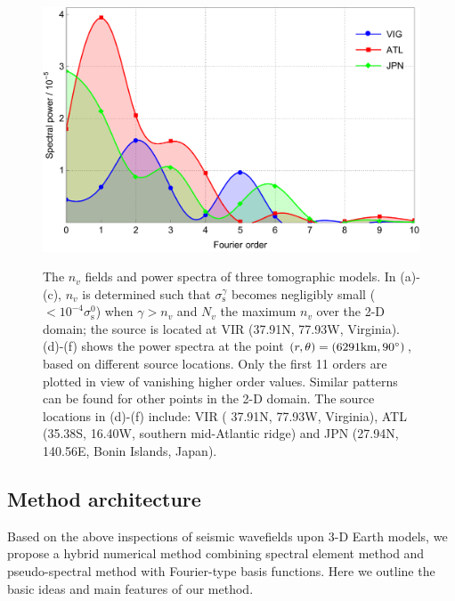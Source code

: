 \documentclass[extra]{gji}
\begin{document}
\begin{figure}
\begin{minipage}{0.6\textwidth}
    \label{fig:s2pow}\par \medskip \vfill
    \includegraphics[height=.6\textwidth]{fig/model/s4pow.pdf} 
    \label{fig:s4pow}\par \medskip \vfill
  \end{minipage}%
  \caption{The $n_v$ fields and power spectra of three tomographic models.
  In (a)-(c), $n_v$ is determined such that $\sigma_{\text{s}}^\gamma$ 
  becomes negligibly small ($<10^{-4}\sigma_{\text{s}}^0$) when 
  $\gamma>n_v$ and $N_v$ the maximum $n_v$
  over the 2-D domain; 
  the source is located at VIR (37.91\degr N, 77.93\degr W, Virginia).
  (d)-(f) shows the power spectra at the point
  $\left(r,\theta\right)=\left(6291\text{km},90\hbox{$^\circ$}\right)$, based on different source
  locations. Only the first 11 orders are plotted in view of vanishing 
  higher order values. Similar patterns can be found for other points 
  in the 2-D domain. 
  The source locations in (d)-(f) include: VIR (
  37.91\degr N, 77.93\degr W, Virginia), ATL (35.38\degr S, 
  16.40\degr W, southern mid-Atlantic ridge) and JPN (27.94\degr N, 
  140.56\degr E, Bonin Islands, Japan).}
  \label{fig:spectra}
\end{figure}

\subsection{Method architecture}
\label{sec:idea}
Based on the above inspections of seismic wavefields upon 3-D Earth models, 
we propose a hybrid numerical method combining spectral element method and
pseudo-spectral method with Fourier-type basis functions. 
Here we outline the basic ideas and main features of our method.
\end{document}
